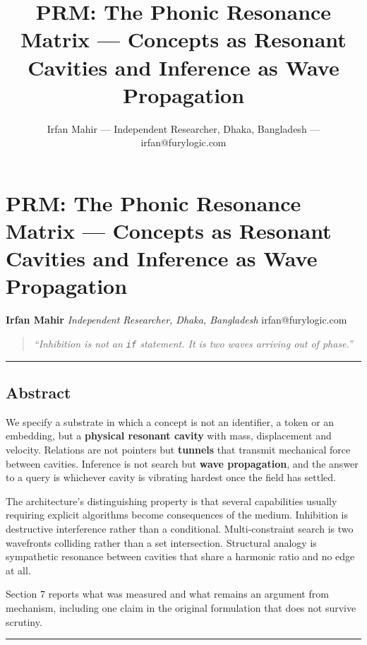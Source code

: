 \documentclass[
  11pt,
  a4paper,
]{article}
\title{PRM: The Phonic Resonance Matrix --- Concepts as Resonant
Cavities and Inference as Wave Propagation}
\author{Irfan Mahir --- Independent Researcher, Dhaka, Bangladesh ---
irfan@furylogic.com}
\date{}
\begin{document}
\maketitle

{
\hypersetup{linkcolor=}
\setcounter{tocdepth}{3}
\tableofcontents
}
\section{PRM: The Phonic Resonance Matrix --- Concepts as Resonant
Cavities and Inference as Wave
Propagation}\label{prm-the-phonic-resonance-matrix-concepts-as-resonant-cavities-and-inference-as-wave-propagation}

\textbf{Irfan Mahir} \emph{Independent Researcher, Dhaka, Bangladesh}
irfan@furylogic.com

\begin{quote}
\emph{``Inhibition is not an \texttt{if} statement. It is two waves
arriving out of phase.''}
\end{quote}

\begin{center}\rule{0.5\linewidth}{0.5pt}\end{center}

\subsection{Abstract}\label{abstract}

We specify a substrate in which a concept is not an identifier, a token
or an embedding, but a \textbf{physical resonant cavity} with mass,
displacement and velocity. Relations are not pointers but
\textbf{tunnels} that transmit mechanical force between cavities.
Inference is not search but \textbf{wave propagation}, and the answer to
a query is whichever cavity is vibrating hardest once the field has
settled.

The architecture's distinguishing property is that several capabilities
usually requiring explicit algorithms become consequences of the medium.
Inhibition is destructive interference rather than a conditional.
Multi-constraint search is two wavefronts colliding rather than a set
intersection. Structural analogy is sympathetic resonance between
cavities that share a harmonic ratio and no edge at all.

Section 7 reports what was measured and what remains an argument from
mechanism, including one claim in the original formulation that does not
survive scrutiny.

\begin{center}\rule{0.5\linewidth}{0.5pt}\end{center}
\end{document}
